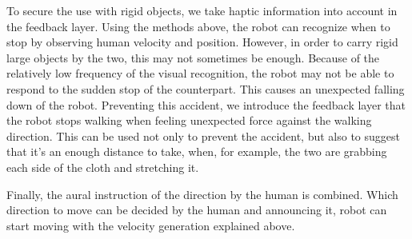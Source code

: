 To secure the use with rigid objects, we take haptic information into account in the feedback layer. Using the methods above, the robot can recognize when to stop by observing human velocity and position. However, in order to carry rigid large objects by the two, this may not sometimes be enough. Because of the relatively low frequency of the visual recognition, the robot may not be able to respond to the sudden stop of the counterpart. This causes an unexpected falling down of the robot. Preventing this accident, we introduce the feedback layer that the robot stops walking when feeling unexpected force against the walking direction. This can be used not only to prevent the accident, but also to suggest that it's an enough distance to take, when, for example, the two are grabbing each side of the cloth and stretching it.

Finally, the aural instruction of the direction by the human is combined. Which direction to move can be decided by the human and announcing it, robot can start moving with the velocity generation explained above.

